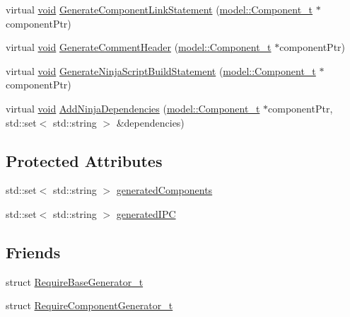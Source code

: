 \begin{DoxyCompactItemize}
\item 
virtual \hyperlink{_t_e_m_p_l_a_t_e__cdef_8h_ac9c84fa68bbad002983e35ce3663c686}{void} \hyperlink{classninja_1_1_component_build_script_generator__t_a3823389944a713845d28545f7406ccf0}{Generate\+Component\+Link\+Statement} (\hyperlink{structmodel_1_1_component__t}{model\+::\+Component\+\_\+t} $\ast$component\+Ptr)
\item 
virtual \hyperlink{_t_e_m_p_l_a_t_e__cdef_8h_ac9c84fa68bbad002983e35ce3663c686}{void} \hyperlink{classninja_1_1_component_build_script_generator__t_a139587dc619fbcf202aad3d7f85d5c0b}{Generate\+Comment\+Header} (\hyperlink{structmodel_1_1_component__t}{model\+::\+Component\+\_\+t} $\ast$component\+Ptr)
\item 
virtual \hyperlink{_t_e_m_p_l_a_t_e__cdef_8h_ac9c84fa68bbad002983e35ce3663c686}{void} \hyperlink{classninja_1_1_component_build_script_generator__t_a07edbe433fa012613314510c4d9340f4}{Generate\+Ninja\+Script\+Build\+Statement} (\hyperlink{structmodel_1_1_component__t}{model\+::\+Component\+\_\+t} $\ast$component\+Ptr)
\item 
virtual \hyperlink{_t_e_m_p_l_a_t_e__cdef_8h_ac9c84fa68bbad002983e35ce3663c686}{void} \hyperlink{classninja_1_1_component_build_script_generator__t_ab9a4a87c70ebe105e2211e66c6e9e5b1}{Add\+Ninja\+Dependencies} (\hyperlink{structmodel_1_1_component__t}{model\+::\+Component\+\_\+t} $\ast$component\+Ptr, std\+::set$<$ std\+::string $>$ \&dependencies)
\end{DoxyCompactItemize}
\subsection*{Protected Attributes}
\begin{DoxyCompactItemize}
\item 
std\+::set$<$ std\+::string $>$ \hyperlink{classninja_1_1_component_build_script_generator__t_aea155e85d71b9734a017712dbb5f3942}{generated\+Components}
\item 
std\+::set$<$ std\+::string $>$ \hyperlink{classninja_1_1_component_build_script_generator__t_a98ae4bbd7b3285dd51073a901971a4be}{generated\+I\+PC}
\end{DoxyCompactItemize}
\subsection*{Friends}
\begin{DoxyCompactItemize}
\item 
struct \hyperlink{classninja_1_1_component_build_script_generator__t_ab9382de245c70f2507eecb5feb3d6663}{Require\+Base\+Generator\+\_\+t}
\item 
struct \hyperlink{classninja_1_1_component_build_script_generator__t_aac209b147ecd6cb83eb8c87f5020f5a7}{Require\+Component\+Generator\+\_\+t}
\end{DoxyCompactItemize}


